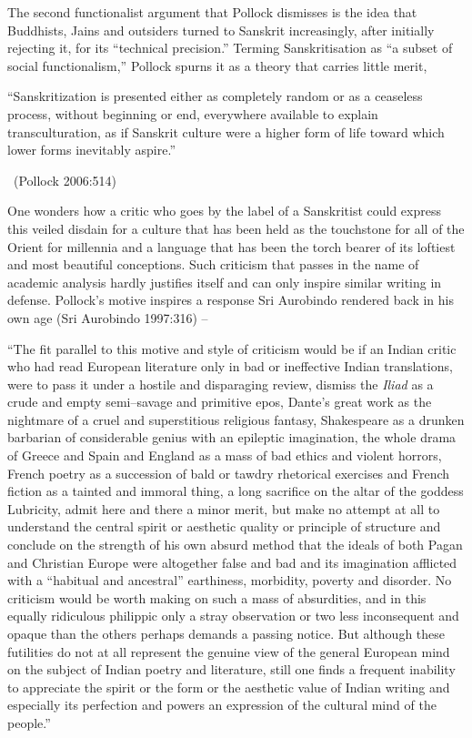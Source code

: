 The second functionalist argument that Pollock dismisses is the idea that Buddhists, Jains and outsiders turned to Sanskrit increasingly, after initially rejecting it, for its “technical precision.” Terming Sanskritisation as “a subset of social functionalism,” Pollock spurns it as a theory that carries little merit,

\begin{myquote}
“Sanskritization is presented either as completely random or as a ceaseless process, without beginning or end, everywhere available to explain transculturation, as if Sanskrit culture were a higher form of life toward which lower forms inevitably aspire.” 

~\hfill (Pollock 2006:514)
\end{myquote}

One wonders how a critic who goes by the label of a Sanskritist could express this veiled disdain for a culture that has been held as the touchstone for all of the Orient for millennia and a language that has been the torch bearer of its loftiest and most beautiful conceptions. Such criticism that passes in the name of academic analysis hardly justifies itself and can only inspire similar writing in defense. Pollock’s motive inspires a response Sri Aurobindo rendered back in his own age (Sri Aurobindo 1997:316) –

\begin{myquote}
“The fit parallel to this motive and style of criticism would be if an Indian critic who had read European literature only in bad or ineffective Indian translations, were to pass it under a hostile and disparaging review, dismiss the \textit{Iliad} as a crude and empty semi–savage and primitive epos, Dante’s great work as the nightmare of a cruel and superstitious religious fantasy, Shakespeare as a drunken barbarian of considerable genius with an epileptic imagination, the whole drama of Greece and Spain and England as a mass of bad ethics and violent horrors, French poetry as a succession of bald or tawdry rhetorical exercises and French fiction as a tainted and immoral thing, a long sacrifice on the altar of the goddess Lubricity, admit here and there a minor merit, but make no attempt at all to understand the central spirit or aesthetic quality or principle of structure and conclude on the strength of his own absurd method that the ideals of both Pagan and Christian Europe were altogether false and bad and its imagination afflicted with a “habitual and ancestral” earthiness, morbidity, poverty and disorder. No criticism would be worth making on such a mass of absurdities, and in this equally ridiculous philippic only a stray observation or two less inconsequent and opaque than the others perhaps demands a passing notice. But although these futilities do not at all represent the genuine view of the general European mind on the subject of Indian poetry and literature, still one finds a frequent inability to appreciate the spirit or the form or the aesthetic value of Indian writing and especially its perfection and powers an expression of the cultural mind of the people.”
\end{myquote}

